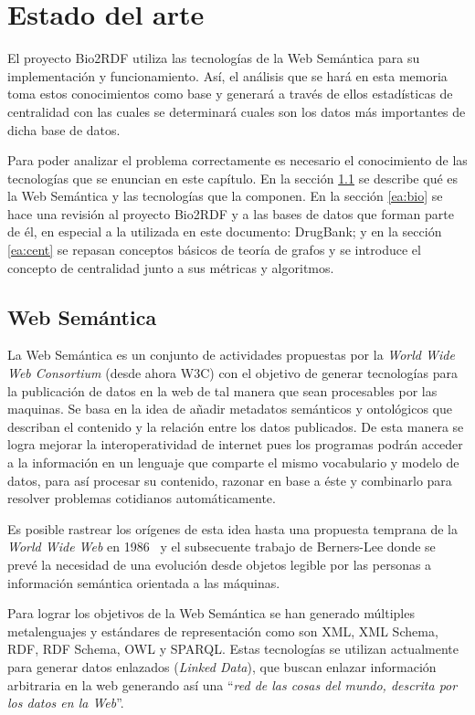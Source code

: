 
\chapter{Estado del arte}
El proyecto Bio2RDF utiliza las tecnologías de la Web Semántica para su
implementación y funcionamiento. Así, el análisis que se hará en esta memoria
toma estos conocimientos como base y generará a través de ellos estadísticas de
centralidad con las cuales se determinará cuales son los datos más importantes
de dicha base de datos.

Para poder analizar el problema correctamente es necesario el conocimiento de
las tecnologías que se enuncian en este capítulo. En la sección \ref{ea:ws} se
describe qué es la Web Semántica y las tecnologías que la componen.
En la sección \ref{ea:bio} se hace una revisión al proyecto Bio2RDF y a las
bases de datos que forman parte de él, en especial a la utilizada en este
documento: DrugBank; y en la sección \ref{ea:cent} se repasan conceptos básicos
de teoría de grafos y se introduce el concepto de centralidad junto a sus
métricas y algoritmos.

\section{Web Semántica}\label{ea:ws}
La Web Semántica es un conjunto de actividades propuestas por la \emph{World
Wide Web Consortium} (desde ahora W3C) con el objetivo de generar tecnologías
para la publicación de datos en la web de tal manera que sean procesables por
las maquinas. 
Se basa en la idea de añadir metadatos semánticos y ontológicos que describan el
contenido y la relación entre los datos publicados.
De esta manera se logra mejorar la interoperatividad de internet pues los
programas podrán acceder a la información en un lenguaje que comparte el mismo 
vocabulario y modelo de datos, para así procesar su contenido, razonar en base a
éste y combinarlo para resolver problemas cotidianos automáticamente.

Es posible rastrear los orígenes de esta idea hasta una propuesta temprana de la
\emph{World Wide Web} en 1986~\cite{berners1989proposal} y el subsecuente
trabajo de Berners-Lee \etal\cite{berners1992world} donde se prevé la
necesidad de una evolución desde objetos legible por las personas a información
semántica orientada a las máquinas.

Para lograr los objetivos de la Web Semántica se han generado múltiples
metalenguajes y estándares de representación como son XML, XML Schema, RDF,
RDF Schema, OWL y SPARQL. Estas tecnologías se utilizan actualmente para generar
datos enlazados (\emph{Linked Data}), que buscan enlazar información arbitraria
en la web generando así una ``\emph{red de las cosas del mundo, descrita por los
datos en la Web}''\cite{berners2011linked}.

